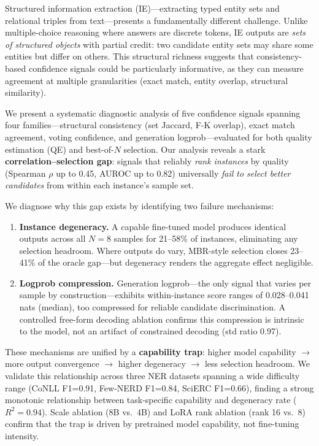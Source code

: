 \documentclass[11pt,twocolumn]{article}
\begin{document}
Structured information extraction (IE)---extracting typed entity sets and relational triples from text---presents a fundamentally different challenge.
Unlike multiple-choice reasoning where answers are discrete tokens, IE outputs are \emph{sets of structured objects} with partial credit: two candidate entity sets may share some entities but differ on others.
This structural richness suggests that consistency-based confidence signals could be particularly informative, as they can measure agreement at multiple granularities (exact match, entity overlap, structural similarity).

We present a systematic diagnostic analysis of five confidence signals spanning four families---structural consistency (set Jaccard, F-K overlap), exact match agreement, voting confidence, and generation logprob---evaluated for both quality estimation (QE) and best-of-$N$ selection.
Our analysis reveals a stark \textbf{correlation--selection gap}: signals that reliably \emph{rank instances} by quality (Spearman $\rho$ up to 0.45, AUROC up to 0.82) universally \emph{fail to select better candidates} from within each instance's sample set.

We diagnose why this gap exists by identifying two failure mechanisms:
\begin{enumerate}
\item \textbf{Instance degeneracy.} A capable fine-tuned model produces identical outputs across all $N{=}8$ samples for 21--58\% of instances, eliminating any selection headroom. Where outputs do vary, MBR-style selection closes 23--41\% of the oracle gap---but degeneracy renders the aggregate effect negligible.
\item \textbf{Logprob compression.} Generation logprob---the only signal that varies per sample by construction---exhibits within-instance score ranges of 0.028--0.041 nats (median), too compressed for reliable candidate discrimination. A controlled free-form decoding ablation confirms this compression is intrinsic to the model, not an artifact of constrained decoding (std ratio 0.97).
\end{enumerate}

These mechanisms are unified by a \textbf{capability trap}: higher model capability $\rightarrow$ more output convergence $\rightarrow$ higher degeneracy $\rightarrow$ less selection headroom.
We validate this relationship across three NER datasets spanning a wide difficulty range (CoNLL F1=0.91, Few-NERD F1=0.84, SciERC F1=0.66), finding a strong monotonic relationship between task-specific capability and degeneracy rate ($R^2{=}0.94$).
Scale ablation (8B vs.\ 4B) and LoRA rank ablation (rank 16 vs.\ 8) confirm that the trap is driven by pretrained model capability, not fine-tuning intensity.
\end{document}
